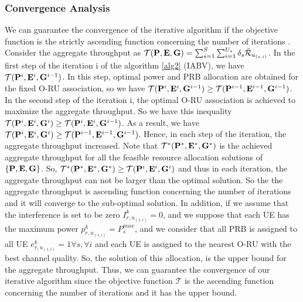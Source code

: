 \documentclass[lettersize,journal]{IEEEtran}
\begin{document}
\subsubsection{Convergence Analysis}
We can guarantee the convergence of the iterative algorithm if the objective function is the strictly ascending function concerning the number of iterations \cite{gholipoor2020resource}.
Consider the aggregate throughput as $\mathcal{T(\bold{P},\bold{E},\bold{G})} =\sum_{s=1}^{S}\sum_{i=1}^{U_s}\delta_s \bar{\mathcal{R}}_{u_{(s,i)}}$.
In the first step of the iteration i of the algorithm \ref{alg2} (IABV), we have $\mathcal{T}(\bold{P}^{i},\bold{E}^i,\bold{G}^{i-1})$.
In this step, optimal power and PRB allocation are obtained for the fixed O-RU association, so we have
$\mathcal{T}(\bold{P}^{i},\bold{E}^i,\bold{G}^{i-1}) \geq \mathcal{T}(\bold{P}^{i-1},\bold{E}^{i-1},\bold{G}^{i-1})$.
In the second step of the iteration i, the optimal O-RU association is achieved to maximize the aggregate throughput. So we have this inequality
$\mathcal{T}(\bold{P}^{i},\bold{E}^i,\bold{G}^{i}) \geq \mathcal{T}(\bold{P}^{i},\bold{E}^{i},\bold{G}^{i-1})$.
As a result, we have
$\mathcal{T}(\bold{P}^{i},\bold{E}^i,\bold{G}^{i}) \geq \mathcal{T}(\bold{P}^{i-1},\bold{E}^{i-1},\bold{G}^{i-1})$.
Hence, in each step of the iteration, the aggregate throughput increased.
Note that $\mathcal{T}^*(\bold{P}^{*},\bold{E}^*,\bold{G}^{*})$ is the achieved aggregate throughput
for all the feasible resource allocation solutions of $\{\bold{P},\bold{E},\bold{G}\}$.
So, $\mathcal{T}^*(\bold{P}^{*},\bold{E}^*,\bold{G}^{*}) \geq \mathcal{T}(\bold{P}^{i},\bold{E}^i,\bold{G}^{i})$ and thus in each iteration, the aggregate throughput can not be larger than the optimal solution.
So the the aggregate throughput is ascending function concerning the number of iterations and it will converge to the sub-optimal solution.
In addition, if we assume that the interference is set to be zero ${I}_{r,u_{(s,i)}}^{k}=0$,
and we suppose that each UE has the maximum power $p_{r,u_{(s,i)}}^k = P_{s}^{max}$,
and we consider that all PRB is assigned to all UE $e_{r,u_{(s,i)}}^k = 1 \forall s,\forall i$
and each UE is assigned to the nearest O-RU with the best channel quality. So, the solution of this allocation, is the upper bound
for the aggregate throughput. Thus,
we can guarantee the convergence of our iterative algorithm since the objective function $\mathcal{T}$ is the ascending function concerning the number of iterations
 and it has the upper bound.
\end{document}
